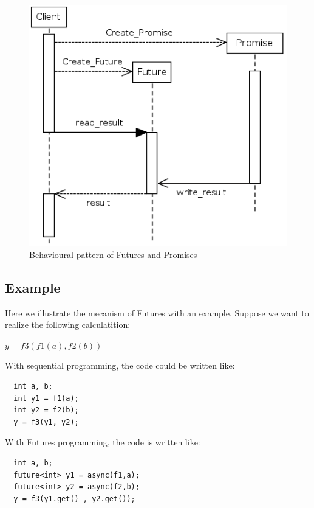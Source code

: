 \documentclass{llncs}
\begin{document}
\begin{figure}[h]
\begin{center}
\includegraphics[scale=0.5]{Images/Im1.png}
\end{center}
\caption{Behavioural pattern of Futures and Promises}
\label{thread}
\end{figure}

\subsection{Example}
Here we illustrate the mecanism of Futures with an example. Suppose we want to realize the following calculatition:   
\begin{center}
  $y = f3(f1(a),f2(b))$
\end{center}

With sequential programming, the code could be written like:
\begin{lstlisting}
  int a, b;
  int y1 = f1(a);
  int y2 = f2(b);
  y = f3(y1, y2);
\end{lstlisting}

With Futures programming, the code is written like:
\begin{lstlisting}
  int a, b;
  future<int> y1 = async(f1,a);
  future<int> y2 = async(f2,b);
  y = f3(y1.get() , y2.get());
\end{lstlisting}
\end{document}
